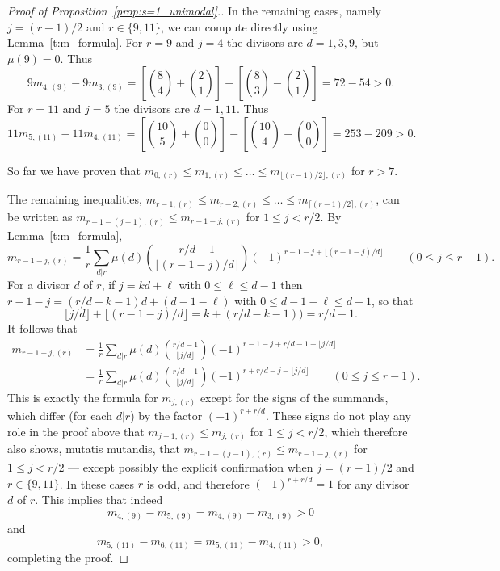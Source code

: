 \documentclass[10pt]{article}
\theoremstyle{definition}
\begin{document}
\begin{proof}[Proof of Proposition~\ref{prop:s=1_unimodal}.]
	In the remaining cases, namely $j = (r-1)/2$ and $r \in \{9,11\}$, we can compute directly using 	Lemma~\ref{t:m_formula}.
	For $r=9$ and $j=4$ the divisors are $d=1,3,9$, but $\mu(9) = 0$. Thus
	\[
		9m_{4,(9)}-9m_{3,(9)} 
		= \left[ \binom{8}{4} + \binom{2}{1} \right]
		- \left[ \binom{8}{3} - \binom{2}{1} \right]
		= 72 - 54 > 0.
	\]
	For $r=11$ and $j=5$ the divisors are $d=1,11$. Thus
	\[
		11m_{5,(11)}-11m_{4,(11)} 
		= \left[ \binom{10}{5} + \binom{0}{0} \right]
		- \left[ \binom{10}{4} - \binom{0}{0} \right]
		= 253 - 209 > 0.
	\]
    
	So far we have proven that $m_{0,(r)} \le m_{1,(r)} \le \ldots \le m_{\lfloor (r-1)/2 \rfloor, (r)}$ for $r > 7$.
	
	The remaining inequalities, $m_{r-1,(r)} \le m_{r-2,(r)} \le \ldots \le m_{\lceil (r-1)/2 \rceil, (r)}$, can be written as $m_{r - 1 - (j-1),(r)} \le m_{r - 1 - j,(r)}$ for $1 \le j < r/2$.
	By Lemma~\ref{t:m_formula},
	\[
		m_{r-1-j,(r)}
		= \frac{1}{r} \sum_{d|r} \mu(d) \binom{r/d - 1}{\lfloor (r-1-j)/d \rfloor}  (-1)^{r-1-j+\lfloor (r-1-j)/d \rfloor} 
		\qquad (0 \le j \le r-1).
    \]
    For a divisor $d$ of $r$, if $j = kd + \ell$ with $0 \le \ell \le d-1$ 
    then $r-1-j = (r/d-k-1)d + (d-1-\ell)$ with $0 \le d-1-\ell \le d-1$, 
    so that
    \[
        \lfloor j/d \rfloor + \lfloor (r-1-j)/d \rfloor
        = k + (r/d-k-1)) = r/d-1.
    \]
    It follows that
	\begin{align*}
		m_{r-1-j,(r)}
		&= \frac{1}{r} \sum_{d|r} \mu(d) \binom{r/d - 1}{\lfloor j/d \rfloor}  (-1)^{r-1-j+r/d-1-\lfloor j/d \rfloor} \\
		&= \frac{1}{r} \sum_{d|r} \mu(d) \binom{r/d - 1}{\lfloor j/d \rfloor}  (-1)^{r+r/d-j-\lfloor j/d \rfloor} 
		\qquad (0 \le j \le r-1).
    \end{align*}
    This is exactly the formula for $m_{j,(r)}$ except for the signs of the summands, which differ (for each $d|r$) by the factor $(-1)^{r+r/d}$.
    These signs do not play any role in the proof above that $m_{j-1,(r)} \le m_{j,(r)}$ for $1 \le j < r/2$, which therefore also shows, mutatis mutandis, that $m_{r-1-(j-1),(r)} \le m_{r-1-j,(r)}$ for $1 \le j < r/2$ --- except possibly the explicit confirmation when $j = (r-1)/2$ and $r \in \{9,11\}$. 
    In these cases $r$ is odd, and therefore $(-1)^{r+r/d} = 1$ for any divisor $d$ of $r$.
    This implies that indeed 
	\[
		m_{4,(9)}-m_{5,(9)} 
		= m_{4,(9)}-m_{3,(9)}
		> 0
	\]
	and
	\[
		m_{5,(11)}-m_{6,(11)} 
		= m_{5,(11)}-m_{4,(11)} 
		> 0,
	\]
    completing the proof.
\end{proof}
\end{document}
